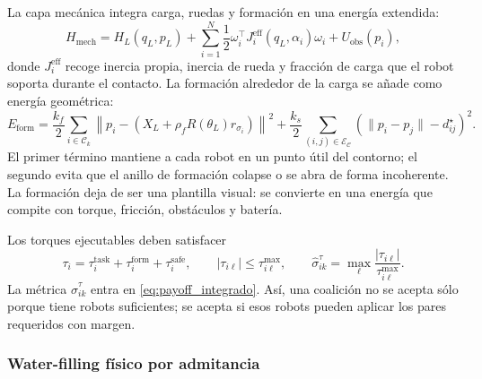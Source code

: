La capa mecánica integra carga, ruedas y formación en una energía extendida:
\begin{equation}
  H_{\mathrm{mech}}
  =
  H_L(q_L,p_L)
  +
  \sum_{i=1}^{N}
  \frac12\omega_i^\top J_i^{\mathrm{eff}}(q_L,\alpha_i)\omega_i
  +
  U_{\mathrm{obs}}(p_i),
  \label{eq:hamiltoniano_mecanico_integrado}
\end{equation}
donde $J_i^{\mathrm{eff}}$ recoge inercia propia, inercia de rueda y fracción de carga
que el robot soporta durante el contacto. La formación alrededor de la carga se añade
como energía geométrica:
\begin{equation}
  E_{\mathrm{form}}
  =
  \frac{k_f}{2}
  \sum_{i\in\mathcal C_k}
  \left\|
    p_i-\left(X_L+\rho_fR(\theta_L)r_{\sigma_i}\right)
  \right\|^2
  +
  \frac{k_s}{2}
  \sum_{(i,j)\in\mathcal E_{\mathcal C}}
  \left(\|p_i-p_j\|-d_{ij}^\star\right)^2 .
  \label{eq:energia_formacion_integrada}
\end{equation}
El primer término mantiene a cada robot en un punto útil del contorno; el segundo evita
que el anillo de formación colapse o se abra de forma incoherente. La formación deja de
ser una plantilla visual: se convierte en una energía que compite con torque, fricción,
obstáculos y batería.

Los torques ejecutables deben satisfacer
\begin{equation}
  \tau_i=
  \tau_i^{\mathrm{task}}
  +\tau_i^{\mathrm{form}}
  +\tau_i^{\mathrm{safe}},
  \qquad
  |\tau_{i\ell}|\le\tau_{i\ell}^{\max},
  \qquad
  \widehat\sigma_{ik}^{\tau}
  =
  \max_{\ell}\frac{|\tau_{i\ell}|}{\tau_{i\ell}^{\max}} .
  \label{eq:torque_integrado}
\end{equation}
La métrica $\widehat\sigma_{ik}^{\tau}$ entra en \eqref{eq:payoff_integrado}. Así, una
coalición no se acepta sólo porque tiene robots suficientes; se acepta si esos robots
pueden aplicar los pares requeridos con margen.

\subsubsection{Water-filling físico por admitancia}

